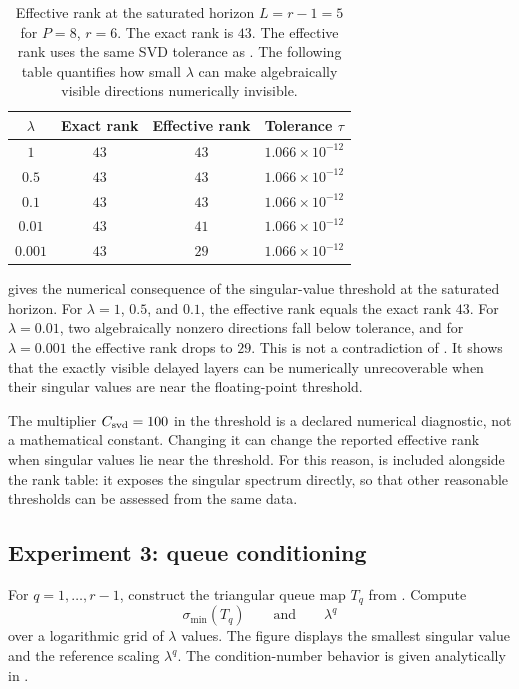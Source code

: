 \documentclass[pdflatex,sn-mathphys-num]{sn-jnl}%
\theoremstyle{thmstyleone}%
\theoremstyle{thmstyletwo}%
\theoremstyle{thmstylethree}%
\begin{document}
\begin{table}[htbp]
\centering
\caption{
Effective rank at the saturated horizon \(L=r-1=5\) for \(P=8\), \(r=6\).
The exact rank is \(43\).  The effective rank uses the same SVD tolerance as
.  The following table quantifies how small \(\lambda\) can
make algebraically visible directions numerically invisible.
}
\begin{tabular}{@{}cccc@{}}
\toprule
\(\lambda\) & Exact rank & Effective rank & Tolerance \(\tau\) \\
\midrule
\(1\)     & \(43\) & \(43\) & \(1.066\times10^{-12}\) \\
\(0.5\)   & \(43\) & \(43\) & \(1.066\times10^{-12}\) \\
\(0.1\)   & \(43\) & \(43\) & \(1.066\times10^{-12}\) \\
\(0.01\)  & \(43\) & \(41\) & \(1.066\times10^{-12}\) \\
\(0.001\) & \(43\) & \(29\) & \(1.066\times10^{-12}\) \\
\bottomrule
\end{tabular}
\label{tab:effective-rank-saturation}
\end{table}

 gives the numerical consequence of
the singular-value threshold at the saturated horizon.  For
\(\lambda=1\), \(0.5\), and \(0.1\), the effective rank equals the exact
rank \(43\).  For \(\lambda=0.01\), two algebraically nonzero directions
fall below tolerance, and for \(\lambda=0.001\) the effective rank drops to \(29\).  This is not a contradiction of .  It shows that the
exactly visible delayed layers can be numerically unrecoverable when their
singular values are near the floating-point threshold.

The multiplier \(C_{\rm svd}=100\) in the threshold is a declared numerical
diagnostic, not a mathematical constant.  Changing it can change the
reported effective rank when singular values lie near the threshold.  For
this reason,  is included alongside the
rank table: it exposes the singular spectrum directly, so that other
reasonable thresholds can be assessed from the same data.

\subsection{Experiment 3: queue conditioning}

For \(q=1,\ldots,r-1\), construct the triangular queue map \(T_q\) from
.  Compute
\[
  \sigma_{\min}(T_q)
  \qquad
  \text{and}
  \qquad
  \lambda^q
\]
over a logarithmic grid of \(\lambda\) values.  The figure displays the
smallest singular value and the reference scaling \(\lambda^q\).  The
condition-number behavior is given analytically in .
\end{document}
